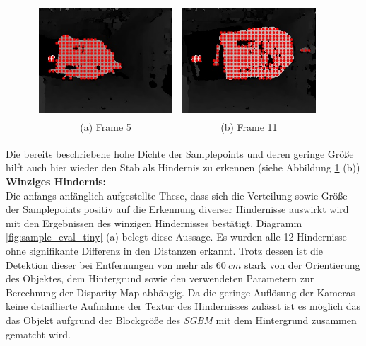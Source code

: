 	\begin{figure}[h]
		\centering
		\begin{tabular}{cc}
		\includegraphics[width=5cm]{img/evaluation/sample_tiny_test_5_disparity}&
		\includegraphics[width=5cm]{img/evaluation/sample_tiny_test_11_disparity}\\
		(a) Frame 5 &  (b) Frame 11
		\end{tabular}
		\caption{}
		\label{fig:sample_eval_medium_fails}
	\end{figure}
	
	\noindent
	Die bereits beschriebene hohe Dichte der Samplepoints und deren geringe Größe hilft auch hier wieder den Stab als Hindernis zu erkennen (siehe Abbildung \ref{fig:sample_eval_medium_fails} (b))\\


	\noindent
	\textbf{Winziges Hindernis:}\\
	Die anfangs anfänglich aufgestellte These, dass sich die Verteilung sowie Größe der Samplepoints positiv auf die Erkennung diverser Hindernisse auswirkt wird mit den Ergebnissen des winzigen Hindernisses bestätigt. Diagramm \ref{fig:sample_eval_tiny} (a) belegt diese Aussage. Es wurden alle 12 Hindernisse ohne signifikante Differenz in den Distanzen erkannt. Trotz dessen ist die Detektion dieser bei Entfernungen von mehr als $60\ cm$ stark von der Orientierung des Objektes, dem Hintergrund sowie den verwendeten Parametern zur Berechnung der Disparity Map abhängig. Da die geringe Auflösung der Kameras keine detaillierte Aufnahme der Textur des Hindernisses zulässt ist es möglich das das Objekt aufgrund der Blockgröße des \emph{SGBM} mit dem Hintergrund zusammen gematcht wird. 

